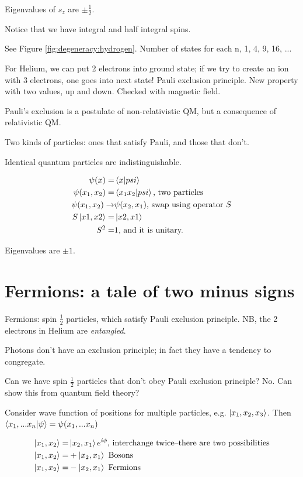 \documentclass[]{article}
\begin{document}
Eigenvalues of $s_z$ are $\pm \frac{1}{2}$.

Notice that we have integral and half integral spins.

See Figure \ref{fig:degeneracy:hydrogen}. Number of states for each n, 1, 4, 9, 16, ...

For Helium, we can put 2 electrons into ground state; if we try to create an ion with 3 electrons, one goes into next state! Pauli exclusion principle. New property with two values, up and down. Checked with magnetic field.

Pauli's exclusion is a postulate of non-relativistic QM, but a consequence of relativistic QM.

Two kinds of particles: ones that satisfy Pauli, and those that don't.

Identical quantum particles are indistinguishable.

\begin{align*}
\psi(x) =& \braket{x|psi}\\
\psi(x_1,x_2) =& \braket{x_1x_2|psi}\text{, two particles}\\
\psi(x_1,x_2) \rightarrow & \psi(x_2,x_1)\text{, swap using operator $S$}\\
S\ket{x1,x2} =& \ket{x2,x1}\\
S^2 =& 1\text{, and it is unitary.}
\end{align*}

Eigenvalues are $\pm1$.

\section{Fermions: a tale of two minus signs}

Fermions: spin $\frac{1}{2}$ particles, which satisfy Pauli exclusion principle. NB, the 2 electrons in Helium are \textit{entangled}.

Photons don't have an exclusion principle; in fact they have a tendency to congregate.
 
Can we have spin $\frac{1}{2}$ particles that don't obey Pauli exclusion principle? No. Can show this from quantum field theory?

Consider wave function of positions for multiple particles, e.g. $\ket{x_1,x_2,x_3}$. Then $\braket{x_1,...x_n|\psi}=\psi(x_1,...x_n)$

\begin{align*}
\ket{x_1, x_2}=&\ket{x_2, x_1}e^{i\phi}\text{, interchange twice--there are two possibilities}\\
\ket{x_1, x_2}=&+\ket{x_2, x_1}\text{ Bosons}\\
\ket{x_1, x_2}=&-\ket{x_2, x_1}\text{ Fermions}
\end{align*}
\end{document}
